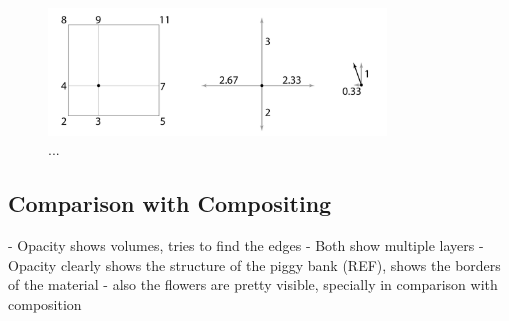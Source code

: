 

\begin{figure}[h!]
    \centering
    \captionsetup{justification=centering,margin=0.5cm}
    \includegraphics[width=0.8\textwidth]{img/local_gradient_vector.pdf}
    \caption{...}
    \label{fig:vector}
\end{figure}


\subsection{Comparison with Compositing}\label{subsec:opacity_compare}

- Opacity shows volumes, tries to find the edges
- Both show multiple layers
- Opacity clearly shows the structure of the piggy bank (REF), shows the borders of the material
- also the flowers are pretty visible, specially in comparison with composition



